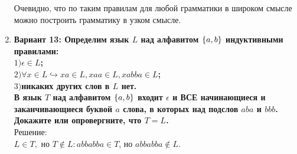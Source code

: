 \documentclass[10pt]{amsart}
\theoremstyle{plain}
\theoremstyle{remark}
\theoremstyle{definition}
\begin{document}
\begin{enumerate}
Очевидно, что по таким правилам для любой грамматики в широком смысле можно построить грамматику в узком смысле.\\
\newpage
\item \textbf{Вариант 13: Определим язык $L$ над алфавитом $\small\{a, b\small\}$ индуктивными правилами:\\
$1) \epsilon \in L$;\\
$2)\forall x \in L \hookrightarrow xa\in L, xaa \in L, xabba \in L$;\\
$3)$никаких других слов в $L$ нет.\\
В язык $T$ над алфавитом $\small\{a, b\small\}$ входит $\epsilon$ и ВСЕ начинающиеся и заканчивающиеся буквой $a$ слова, в которых над подслов $aba$ и $bbb$. Докажите или опровергните, что $ T = L$.}\\
Решение:\\
$L \in T,$ но $T \notin L: abbabba \in T$, но $abbabba \notin L$.


\end{enumerate}
\end{document}
